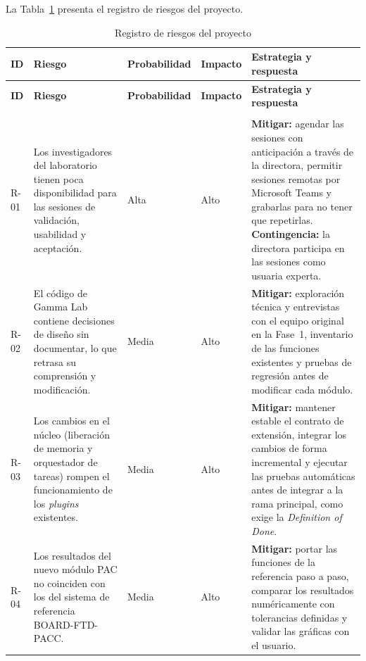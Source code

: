 \documentclass{article}
\begin{document}
La Tabla~\ref{tab:registro_riesgos} presenta el registro de riesgos del proyecto.

\begin{longtable}{|>{\raggedright\arraybackslash}p{1cm}|>{\raggedright\arraybackslash}p{4.4cm}|>{\raggedright\arraybackslash}p{1.3cm}|>{\raggedright\arraybackslash}p{1.3cm}|>{\raggedright\arraybackslash}p{5.8cm}|}
\hline
\textbf{ID} & \textbf{Riesgo} & \textbf{Proba\-bilidad} & \textbf{Impacto} & \textbf{Estrategia y respuesta} \\
\hline
\endfirsthead
\hline
\textbf{ID} & \textbf{Riesgo} & \textbf{Proba\-bilidad} & \textbf{Impacto} & \textbf{Estrategia y respuesta} \\
\hline
\endhead
\caption{Registro de riesgos del proyecto} \label{tab:registro_riesgos} \\
\endlastfoot

R-01 & Los investigadores del laboratorio tienen poca disponibilidad para las sesiones de validación, usabilidad y aceptación. & Alta & Alto & \textbf{Mitigar:} agendar las sesiones con anticipación a través de la directora, permitir sesiones remotas por Microsoft Teams y grabarlas para no tener que repetirlas. \textbf{Contingencia:} la directora participa en las sesiones como usuaria experta. \\
\hline

R-02 & El código de Gamma Lab contiene decisiones de diseño sin documentar, lo que retrasa su comprensión y modificación. & Media & Alto & \textbf{Mitigar:} exploración técnica y entrevistas con el equipo original en la Fase~1, inventario de las funciones existentes y pruebas de regresión antes de modificar cada módulo. \\
\hline

R-03 & Los cambios en el núcleo (liberación de memoria y orquestador de tareas) rompen el funcionamiento de los \textit{plugins} existentes. & Media & Alto & \textbf{Mitigar:} mantener estable el contrato de extensión, integrar los cambios de forma incremental y ejecutar las pruebas automáticas antes de integrar a la rama principal, como exige la \textit{Definition of Done}. \\
\hline

R-04 & Los resultados del nuevo módulo PAC no coinciden con los del sistema de referencia BOARD-FTD-PACC. & Media & Alto & \textbf{Mitigar:} portar las funciones de la referencia paso a paso, comparar los resultados numéricamente con tolerancias definidas y validar las gráficas con el usuario. \\
\hline


\end{longtable}
\end{document}
